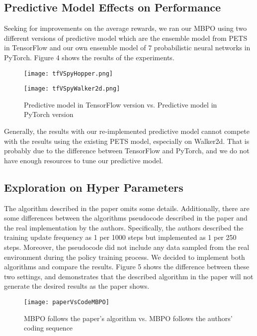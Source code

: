 \documentclass{article}
\begin{document}
\subsection{Predictive Model Effects on Performance}

Seeking for improvements on the average rewards, we ran our MBPO using two different versions of predictive model which are the ensemble model from PETS in TensorFlow and our own ensemble model of 7 probabilistic neural networks in PyTorch. Figure 4 shows the results of the experiments.

\begin{figure}[h]
\centering
\begin{minipage}[t]{0.48\textwidth}
\centering
\texttt{[image: tfVSpyHopper.png]}
\end{minipage}
\begin{minipage}[t]{0.48\textwidth}
\centering
\texttt{[image: tfVSpyWalker2d.png]}
\end{minipage}
\caption{Predictive model in TensorFlow version vs. Predictive model in PyTorch version}
\end{figure}

Generally, the results with our re-implemented predictive model cannot compete with the results using the existing PETS model, especially on Walker2d. That is probably due to the difference between TensorFlow and PyTorch, and we do not have enough resources to tune our predictive model.

\subsection{Exploration on Hyper Parameters}

The algorithm described in the paper omits some details. Additionally, there are some differences between the algorithms pseudocode described in the paper and the real implementation by the authors. Specifically, the authors described the training update frequency as 1 per 1000 steps but implemented as 1 per 250 steps. Moreover, the pseudocode did not include any data sampled from the real environment during the policy training process. We decided to implement both algorithms and compare the results. Figure 5 shows the difference between these two settings, and demonstrates that the described algorithm in the paper will not generate the desired results as the paper shows.

\begin{figure}[h]
  \centering
  \texttt{[image: paperVsCodeMBPO]}
  \caption{MBPO follows the paper's algorithm vs. MBPO follows the authors' coding sequence}
\end{figure}
\end{document}
